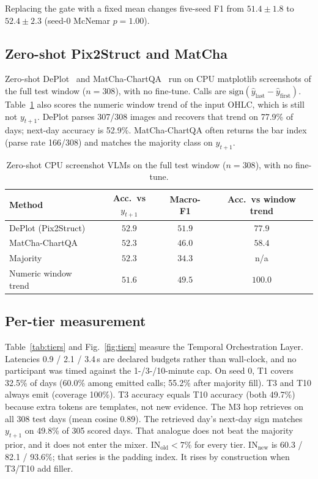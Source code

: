 \documentclass{llncs}
\begin{document}
Replacing the gate with a fixed mean changes five-seed F1 from $51.4\pm1.8$ to $52.4\pm2.3$ (seed-0 McNemar $p=1.00$).

\subsection{Zero-shot Pix2Struct and MatCha}
\label{sec:vlm}
Zero-shot DePlot~\cite{lee2023pix2struct} and MatCha-ChartQA~\cite{liu2023matcha} run on CPU matplotlib screenshots of the full test window ($n=308$), with no fine-tune. Calls are $\mathrm{sign}(\hat{y}_{\mathrm{last}}-\hat{y}_{\mathrm{first}})$. Table~\ref{tab:vlm} also scores the numeric window trend of the input OHLC, which is still not $y_{t+1}$. DePlot parses 307/308 images and recovers that trend on 77.9\% of days; next-day accuracy is 52.9\%. MatCha-ChartQA often returns the bar index (parse rate 166/308) and matches the majority class on $y_{t+1}$.

\begin{table}[t]
\caption{Zero-shot CPU screenshot VLMs on the full test window ($n=308$), with no fine-tune.}
\label{tab:vlm}
\centering
\setlength{\tabcolsep}{3.5pt}
\begin{tabular}{lccc}
\toprule
Method & Acc.\ vs $y_{t+1}$ & Macro-F1 & Acc.\ vs window trend \\
\midrule
DePlot (Pix2Struct) & $52.9$ & $51.9$ & $77.9$ \\
MatCha-ChartQA & $52.3$ & $46.0$ & $58.4$ \\
Majority & $52.3$ & $34.3$ & n/a \\
Numeric window trend & $51.6$ & $49.5$ & $100.0$ \\
\bottomrule
\end{tabular}
\end{table}

\subsection{Per-tier measurement}
\label{sec:tiers}
Table~\ref{tab:tiers} and Fig.~\ref{fig:tiers} measure the Temporal Orchestration Layer. Latencies 0.9 / 2.1 / 3.4\,s are declared budgets rather than wall-clock, and no participant was timed against the 1-/3-/10-minute cap. On seed 0, T1 covers 32.5\% of days (60.0\% among emitted calls; 55.2\% after majority fill). T3 and T10 always emit (coverage 100\%). T3 accuracy equals T10 accuracy (both 49.7\%) because extra tokens are templates, not new evidence. The M3 hop retrieves on all 308 test days (mean cosine 0.89). The retrieved day's next-day sign matches $y_{t+1}$ on 49.8\% of 305 scored days. That analogue does not beat the majority prior, and it does not enter the mixer. $\mathrm{IN}_{\mathrm{old}}<7\%$ for every tier. $\mathrm{IN}_{\mathrm{new}}$ is 60.3 / 82.1 / 93.6\%; that series is the padding index. It rises by construction when T3/T10 add filler.
\end{document}
